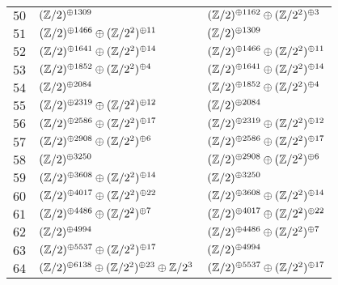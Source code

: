 \begin{supertabular}{|c|p{5.5cm}|p{5.5cm}|}
$50$%
&$(\mathbb{Z}/2)^{\oplus1309}$%
&$(\mathbb{Z}/2)^{\oplus1162}\oplus(\mathbb{Z}/2^{2})^{\oplus3}$\\

$51$%
&$(\mathbb{Z}/2)^{\oplus1466}\oplus(\mathbb{Z}/2^{2})^{\oplus11}$%
&$(\mathbb{Z}/2)^{\oplus1309}$\\

$52$%
&$(\mathbb{Z}/2)^{\oplus1641}\oplus(\mathbb{Z}/2^{2})^{\oplus14}$%
&$(\mathbb{Z}/2)^{\oplus1466}\oplus(\mathbb{Z}/2^{2})^{\oplus11}$\\

$53$%
&$(\mathbb{Z}/2)^{\oplus1852}\oplus(\mathbb{Z}/2^{2})^{\oplus4}$%
&$(\mathbb{Z}/2)^{\oplus1641}\oplus(\mathbb{Z}/2^{2})^{\oplus14}$\\

$54$%
&$(\mathbb{Z}/2)^{\oplus2084}$%
&$(\mathbb{Z}/2)^{\oplus1852}\oplus(\mathbb{Z}/2^{2})^{\oplus4}$\\

$55$%
&$(\mathbb{Z}/2)^{\oplus2319}\oplus(\mathbb{Z}/2^{2})^{\oplus12}$%
&$(\mathbb{Z}/2)^{\oplus2084}$\\

$56$%
&$(\mathbb{Z}/2)^{\oplus2586}\oplus(\mathbb{Z}/2^{2})^{\oplus17}$%
&$(\mathbb{Z}/2)^{\oplus2319}\oplus(\mathbb{Z}/2^{2})^{\oplus12}$\\

$57$%
&$(\mathbb{Z}/2)^{\oplus2908}\oplus(\mathbb{Z}/2^{2})^{\oplus6}$%
&$(\mathbb{Z}/2)^{\oplus2586}\oplus(\mathbb{Z}/2^{2})^{\oplus17}$\\

$58$%
&$(\mathbb{Z}/2)^{\oplus3250}$%
&$(\mathbb{Z}/2)^{\oplus2908}\oplus(\mathbb{Z}/2^{2})^{\oplus6}$\\

$59$%
&$(\mathbb{Z}/2)^{\oplus3608}\oplus(\mathbb{Z}/2^{2})^{\oplus14}$%
&$(\mathbb{Z}/2)^{\oplus3250}$\\

$60$%
&$(\mathbb{Z}/2)^{\oplus4017}\oplus(\mathbb{Z}/2^{2})^{\oplus22}$%
&$(\mathbb{Z}/2)^{\oplus3608}\oplus(\mathbb{Z}/2^{2})^{\oplus14}$\\

$61$%
&$(\mathbb{Z}/2)^{\oplus4486}\oplus(\mathbb{Z}/2^{2})^{\oplus7}$%
&$(\mathbb{Z}/2)^{\oplus4017}\oplus(\mathbb{Z}/2^{2})^{\oplus22}$\\

$62$%
&$(\mathbb{Z}/2)^{\oplus4994}$%
&$(\mathbb{Z}/2)^{\oplus4486}\oplus(\mathbb{Z}/2^{2})^{\oplus7}$\\

$63$%
&$(\mathbb{Z}/2)^{\oplus5537}\oplus(\mathbb{Z}/2^{2})^{\oplus17}$%
&$(\mathbb{Z}/2)^{\oplus4994}$\\

$64$%
&$(\mathbb{Z}/2)^{\oplus6138}\oplus(\mathbb{Z}/2^{2})^{\oplus23}\oplus\mathbb{Z}/2^{3}$%
&$(\mathbb{Z}/2)^{\oplus5537}\oplus(\mathbb{Z}/2^{2})^{\oplus17}$\\


\end{supertabular}
